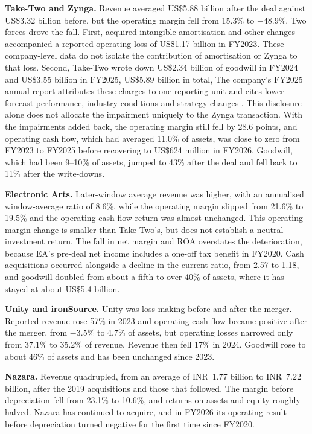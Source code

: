 \documentclass[11pt]{article}
\newcommand{\USD}{US\$}
\newcommand{\INR}{INR~}
\begin{document}
\textbf{Take-Two and Zynga.} Revenue averaged \USD 5.88 billion after the deal against \USD 3.32 billion before, but the operating margin fell from 15.3\% to $-48.9\%$. Two forces drove the fall. First, acquired-intangible amortisation and other changes accompanied a reported operating loss of \USD 1.17 billion in FY2023. These company-level data do not isolate the contribution of amortisation or Zynga to that loss. Second, Take-Two wrote down \USD 2.34 billion of goodwill in FY2024 and \USD 3.55 billion in FY2025, \USD 5.89 billion in total, The company's FY2025 annual report attributes these charges to one reporting unit and cites lower forecast performance, industry conditions and strategy changes \citep{ttwo2025report}. This disclosure alone does not allocate the impairment uniquely to the Zynga transaction. With the impairments added back, the operating margin still fell by 28.6 points, and operating cash flow, which had averaged 11.0\% of assets, was close to zero from FY2023 to FY2025 before recovering to \USD 624 million in FY2026. Goodwill, which had been 9--10\% of assets, jumped to 43\% after the deal and fell back to 11\% after the write-downs.

\textbf{Electronic Arts.} Later-window average revenue was higher, with an annualised window-average ratio of 8.6\%, while the operating margin slipped from 21.6\% to 19.5\% and the operating cash flow return was almost unchanged. This operating-margin change is smaller than Take-Two's, but does not establish a neutral investment return. The fall in net margin and ROA overstates the deterioration, because EA's pre-deal net income includes a one-off tax benefit in FY2020. Cash acquisitions occurred alongside a decline in the current ratio, from 2.57 to 1.18, and goodwill doubled from about a fifth to over 40\% of assets, where it has stayed at about \USD 5.4 billion.

\textbf{Unity and ironSource.} Unity was loss-making before and after the merger. Reported revenue rose 57\% in 2023 and operating cash flow became positive after the merger, from $-3.5\%$ to 4.7\% of assets, but operating losses narrowed only from 37.1\% to 35.2\% of revenue. Revenue then fell 17\% in 2024. Goodwill rose to about 46\% of assets and has been unchanged since 2023.

\textbf{Nazara.} Revenue quadrupled, from an average of \INR 1.77 billion to \INR 7.22 billion, after the 2019 acquisitions and those that followed. The margin before depreciation fell from 23.1\% to 10.6\%, and returns on assets and equity roughly halved. Nazara has continued to acquire, and in FY2026 its operating result before depreciation turned negative for the first time since FY2020.
\end{document}
